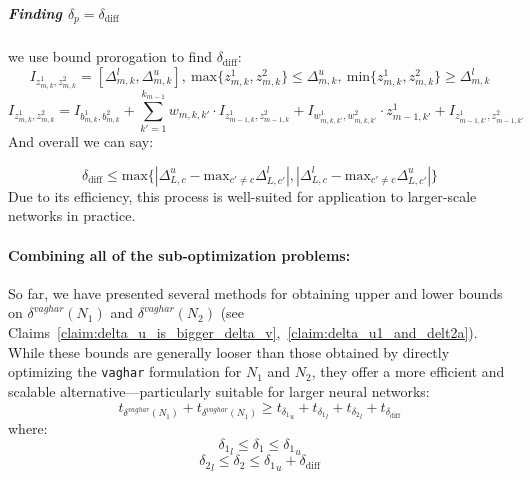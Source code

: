 \documentclass[11pt]{article}
\begin{document}
\subparagraph{Finding $\delta_p=\delta_\text{diff}$}
we use bound prorogation to find $\delta_\text{diff}$:
$$I_{z_{m,k}^1,z_{m,k}^2}=[\Delta_{m,k}^l,\Delta_{m,k}^u],\ \text{max}\{z_{m,k}^1,z_{m,k}^2\}\leq{\Delta_{m,k}^u},\ \text{min}\{z_{m,k}^1,z_{m,k}^2\}\geq{\Delta_{m,k}^l}$$
$$
I_{z_{m,k}^1,z_{m,k}^2}=I_{b_{m,k}^1,b_{m,k}^2}+\sum_{k'=1}^{k_{m-1}}{w_{m,k,k'}\cdot{I_{z_{m-1,k}^1,z_{m-1,k}^2}}+I_{w_{m,k,k'}^1,w_{m,k,k'}^2}\cdot{z_{m-1,k'}^1+I_{z_{m-1,k'}^1,z_{m-1,k'}^2}} }
$$
And overall we can say:

$$\delta_\text{diff}\leq{\text{max}\{|\Delta_{L,c}^u-\text{max}_{c'\ne{c}}{\Delta_{L,c'}^l}|,|\Delta_{L,c}^l-\text{max}_{c'\ne{c}}{\Delta_{L,c'}^u}|\}}$$
Due to its efficiency, this process is well-suited for application to larger-scale networks in practice.   

 
 \paragraph{Combining all of the sub-optimization problems:}
So far, we have presented several methods for obtaining upper and lower bounds on $\delta^{vaghar}(N_1)$ and $\delta^{vaghar}(N_2)$ (see Claims~\ref{claim:delta_u_is_bigger_delta_v},~\ref{claim:delta_u1_and_delt2a}). While these bounds are generally looser than those obtained by directly optimizing the \texttt{vaghar} formulation for $N_1$ and $N_2$, they offer a more efficient and scalable alternative—particularly suitable for larger neural networks:
  $$ t_{\delta^{vaghar}(N_1)} + t_{\delta^{vaghar}(N_1)} \geq t_{{\delta_1}_u} + t_{{\delta_1}_l} + t_{{\delta_2}_l} + t_{\delta_{\text{diff}}}$$
 where:
 $$ {{\delta_1}_l} \leq \delta_1 \leq {{\delta_1}_u} $$
  $$ {{\delta_2}_l} \leq \delta_2 \leq {{\delta_1}_u}+{\delta_{\text{diff}}} $$
  
\end{document}
